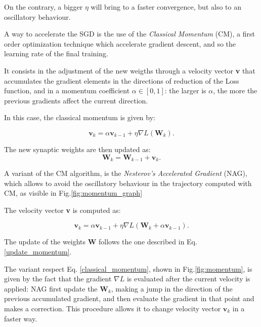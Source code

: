 			On the contrary, a bigger $\eta$ will bring to a faster convergence, but also to an oscillatory behaviour.

			A way to accelerate the SGD is the use of the \textit{Classical Momentum} (CM), a first order optimization technique which accelerate gradient descent, and so the learning rate of the final training.

			It consists in the adjustment of the new weigths through a velocity vector \textbf{v} that accumulates the gradient elements in the directions of reduction of the Loss function, and in a momentum coefficient $\alpha \in [0,1]$: the larger is  $\alpha$, the more the previous gradients affect the current direction.

			In this case, the classical momentum is given by:

			\begin{equation}
				\label{classical_momentum}
				\textbf{v}_k = \alpha\textbf{v}_{k-1} + \eta\nabla\textit{L}(\textbf{W}_k).
			\end{equation}

			The new synaptic weights are then updated as:
			\begin{equation}
				\label{update_momentum}
				\textbf{W}_k = \textbf{W}_{k-1}  + \textbf{v}_k.
			\end{equation}

			A variant of the CM algorithm, is the \textit{Nesterov's Accelerated Gradient} (NAG), which allows to avoid the oscillatory behaviour in the trajectory computed with CM, as visible in Fig.\ref{fig:momentum_graph}%

			The velocity vector \textbf{v} is computed as:

			\begin{equation}
				\label{nesterov_momentum}
				\textbf{v}_k = \alpha\textbf{v}_{k-1} + \eta\nabla\textit{L}(\textbf{W}_k + \alpha\textbf{v}_{k-1}).
			\end{equation}

			The update of the weights \textbf{W} follows the one described in Eq. \ref{update_momentum}.

			The variant respect Eq. \ref{classical_momentum}, shown in Fig.\ref{fig:momentum}, is given by the fact that the gradient $\nabla\textit{L}$ is evaluated after the current velocity is applied: NAG first update the $\textbf{W}_k$, making a jump in the direction of the previous accumulated gradient, and then evaluate the gradient in that point and makes a correction. This procedure allows it to change velocity vector $\textbf{v}_{k}$ in a faster way.

